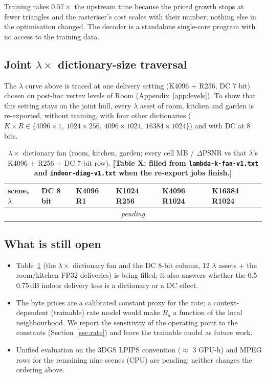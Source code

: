 \documentclass[11pt,a4paper]{article}
\begin{document}
Training takes $0.57\times$ the upstream time because the priced growth stops at fewer triangles and the rasteriser's cost scales with their number; nothing else in the optimisation changed. The decoder is a standalone single-core program with no access to the training data.

\subsection{Joint $\lambda \times$ dictionary-size traversal}
\label{sec:fan}

The $\lambda$ curve above is traced at one delivery setting (K4096 + R256, DC 7 bit) chosen on post-hoc vertex levels of Room (Appendix~\ref{app:levels}). To show that this setting stays on the joint hull, every $\lambda$ asset of room, kitchen and garden is re-exported, without training, with four other dictionaries ($K\times R \in \{4096\times1,\ 1024\times256,\ 4096\times1024,\ 16384\times1024\}$) and with DC at 8 bits.

\begin{table}[h]
\centering\small
\caption{$\lambda \times$ dictionary fan (room, kitchen, garden; every cell MB / $\Delta$PSNR vs that $\lambda$'s K4096 + R256 + DC 7-bit row). \textbf{[Table X: filled from \texttt{lambda-k-fan-v1.txt} and \texttt{indoor-diag-v1.txt} when the re-export jobs finish.]}}
\label{tab:fan}
\begin{tabular}{@{}llllll@{}}
\toprule
scene, $\lambda$ & DC 8 bit & K4096 R1 & K1024 R256 & K4096 R1024 & K16384 R1024 \\
\midrule
\multicolumn{6}{c}{\emph{pending}} \\
\bottomrule
\end{tabular}
\end{table}

\subsection{What is still open}
\begin{itemize}[nosep,leftmargin=*]
  \item Table~\ref{tab:fan} (the $\lambda \times$ dictionary fan and the DC 8-bit column, 12 $\lambda$ assets + the room/kitchen FP32 deliveries) is being filled; it also answers whether the 0.5--0.75\,dB indoor delivery loss is a dictionary or a DC effect.
  \item The byte prices are a calibrated constant proxy for the rate; a context-dependent (trainable) rate model would make $B_a$ a function of the local neighbourhood. We report the sensitivity of the operating point to the constants (Section~\ref{sec:rate}) and leave the trainable model as future work.
  \item Unified evaluation on the 3DGS LPIPS convention ($\approx$ 3 GPU-h) and MPEG rows for the remaining nine scenes (CPU) are pending; neither changes the ordering above.
\end{itemize}
\end{document}
